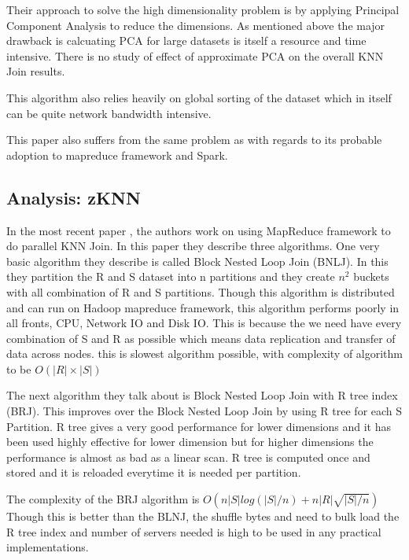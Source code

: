 \documentclass[conference]{IEEEtran}
\begin{document}
\bigskip

Their approach to solve the high dimensionality problem is
by applying Principal Component Analysis to reduce the dimensions. As
mentioned above the major drawback is calcuating PCA for
large datasets is itself a resource and time intensive. There
is no study of effect of approximate PCA on the overall KNN Join results.

\medskip

This algorithm also relies heavily on global sorting of the dataset
which in itself can be quite network bandwidth intensive.

\medskip

This paper also suffers from the same problem as
\cite{yu_efficient_2007} with regards to its probable adoption to
mapreduce framework and Spark.

\bigskip
\subsection{Analysis: zKNN}
In the most recent paper \cite{zhang_efficient_2012}, the authors work on using
MapReduce framework to do parallel KNN Join. In this paper they
describe three algorithms. One very basic algorithm they describe is
called Block Nested Loop Join (BNLJ). In this they partition the R and S
dataset into n partitions and they create $n^2$ buckets
with all combination of R and S partitions. Though this algorithm is
distributed and can run on Hadoop mapreduce framework, this algorithm
performs poorly in all fronts, CPU, Network IO and Disk IO. This is
because the we need have every combination of S and R as possible
which means data replication and transfer of data across nodes. this
is slowest algorithm possible, with complexity of algorithm to be
$O(|R| \times |S|)$

\bigskip

The next algorithm they talk about is Block Nested Loop Join with R
tree index (BRJ). This improves over the Block Nested Loop Join by using R
tree for each S Partition. R tree gives a very good performance for
lower dimensions and it has been used highly effective for lower
dimension \cite{kuan_fast_1997} but for higher dimensions the
performance is almost as bad as a linear scan. R tree is computed once
and stored and it is reloaded everytime it is needed per partition.

\medskip

The complexity of the BRJ algorithm is $O(n|S|log(|S|/n) + n|R|\sqrt{|S|/n})$
Though this is better than the BLNJ,
the shuffle bytes and need to bulk load the R tree index and number of
servers needed is high to be used in any practical implementations.
\end{document}
